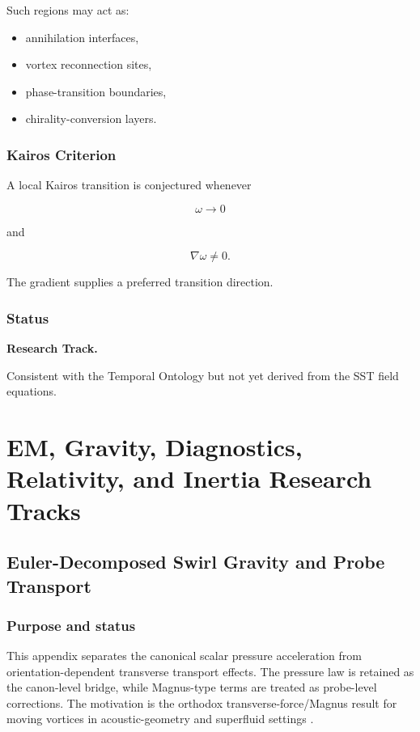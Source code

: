         Such regions may act as:
        
        \begin{itemize}
            \item annihilation interfaces,
            \item vortex reconnection sites,
            \item phase-transition boundaries,
            \item chirality-conversion layers.
        \end{itemize}
    
    \subsubsection{Kairos Criterion}
        
        A local Kairos transition is conjectured whenever
        
        \[
            \omega
            \rightarrow
            0
        \]
        
        and
        
        \[
            \nabla\omega
            \neq
            0.
        \]
        
        The gradient supplies a preferred transition direction.
    
    \subsubsection{Status}
        
        \textbf{Research Track.}
        
        Consistent with the Temporal Ontology but not yet derived from the SST field
        equations.

\section{EM, Gravity, Diagnostics, Relativity, and Inertia Research Tracks}

\subsection{Euler-Decomposed Swirl Gravity and Probe Transport}
\label{sec:appendix_euler_probe_transport}

\subsubsection{Purpose and status}
    This appendix separates the canonical scalar pressure acceleration from
    orientation-dependent transverse transport effects. The pressure law is retained
    as the canon-level bridge, while Magnus-type terms are treated as probe-level
    corrections. The motivation is the orthodox transverse-force/Magnus result for
    moving vortices in acoustic-geometry and superfluid settings
    \cite{Zhang2005TransverseForce,Saffman1992}.

